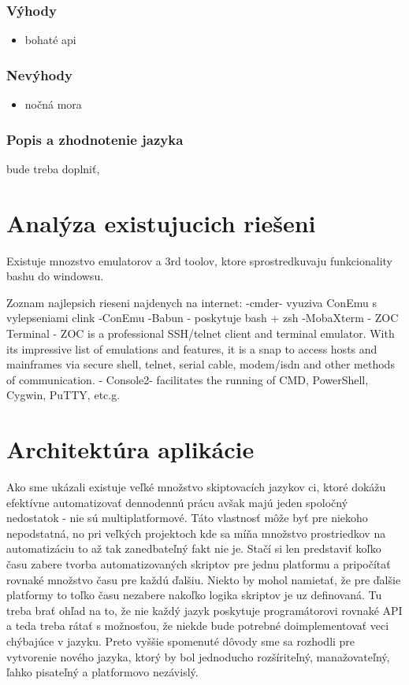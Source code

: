 \subsubsection{Výhody}
\begin{itemize}
	\item bohaté api
	\newline
\end{itemize}
\subsubsection{Nevýhody}
\begin{itemize}
	\item nočná mora
	\newline
\end{itemize}

\subsubsection{Popis a zhodnotenie jazyka}
bude treba doplniť,

\section{Analýza existujucich riešeni}
\indent
Existuje mnozstvo emulatorov a 3rd toolov, ktore sprostredkuvaju funkcionality bashu do windowsu.

Zoznam najlepsich rieseni najdenych na internet:
-cmder- vyuziva ConEmu s vylepseniami clink
-ConEmu
-Babun - poskytuje bash + zsh
-MobaXterm
- ZOC Terminal - ZOC is a professional SSH/telnet client and terminal emulator. With its impressive list of emulations and features, it is a snap to access hosts and mainframes via secure shell, telnet, serial cable, modem/isdn and other methods of communication.
- Console2-  facilitates the running of CMD, PowerShell, Cygwin, PuTTY, etc.g.


\section{Architektúra aplikácie}
\indent Ako sme ukázali existuje veľké množstvo skiptovacích jazykov ci, ktoré dokážu efektívne automatizovať dennodennú prácu avšak majú jeden spoločný nedostatok - nie sú multiplatformové. Táto vlastnosť môže byť  pre niekoho nepodstatná, no pri veľkých projektoch kde sa míňa množstvo prostriedkov na automatizáciu to až tak zanedbateľný fakt nie je. Stačí si len predstaviť koľko času zabere tvorba automatizovaných skriptov pre jednu platformu a pripočítať rovnaké množstvo času pre každú ďalšiu. Niekto by mohol namietať, že pre ďalšie platformy to toľko času nezabere nakoľko logika skriptov je uz definovaná. Tu treba brať ohľad na to, že nie každý jazyk poskytuje programátorovi rovnaké API a teda treba rátať s možnosťou, že niekde bude potrebné doimplementovať veci chýbajúce v jazyku. Preto vyššie spomenuté dôvody sme sa rozhodli pre vytvorenie nového jazyka, ktorý by bol jednoducho rozšíriteľný, manažovateľný, ľahko pisateľný a platformovo nezávislý.

